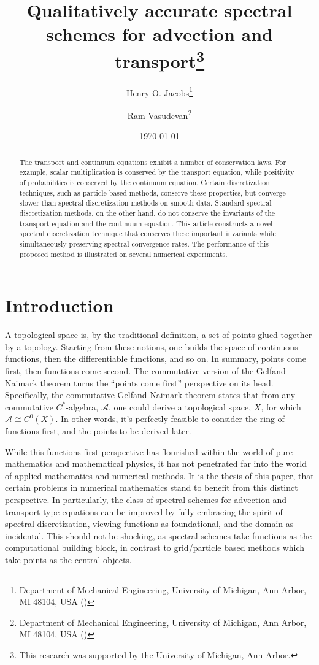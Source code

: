 \documentclass[final,leqno]{siamart}
\title{Qualitatively accurate spectral schemes for advection and transport\thanks{This research was supported by the University of Michigan, Ann Arbor.}}
\author{
    Henry O. Jacobs\thanks{Department of Mechanical Engineering, University of Michigan, Ann Arbor, MI 48104, USA (\email{hojacobs@umich.edu})}
    \and
    Ram Vasudevan\thanks{Department of Mechanical Engineering, University of Michigan, Ann Arbor, MI 48104, USA (\email{ramv@umich.edu}) }
}
\date{\today}
\begin{document}
\maketitle

\begin{abstract}
	The transport and continuum equations exhibit a number of conservation laws.
	For example, scalar multiplication is conserved by the transport equation, while
	positivity of probabilities is conserved by the continuum equation.
	Certain discretization techniques, such as particle based methods, conserve these properties, but converge slower than spectral discretization methods on smooth data.
	Standard spectral discretization methods, on the other hand, do not conserve the invariants of the transport equation and the continuum equation.
	This article constructs a novel spectral discretization technique that conserves these important invariants while simultaneously preserving spectral convergence rates. 
	The performance of this proposed method is illustrated on several numerical experiments. 
\end{abstract}

\section{Introduction}
\label{sec:intro}

A topological space is, by the traditional definition, a set of points glued together by a topology.
Starting from these notions, one builds the space of continuous functions, then the differentiable functions, and so on.
In summary, points come first, then functions come second.
The commutative version of the Gelfand-Naimark theorem turns the ``points come first'' perspective on its head.
Specifically, the commutative Gelfand-Naimark theorem states that from any commutative $C^*$-algebra, $\mathcal{A}$, one could derive a topological space, $X$, for which $\mathcal{A} \cong C^0(X)$.
In other words, it's perfectly feasible to consider the ring of functions first, and the points to be derived later.


While this functions-first perspective has flourished within the world of pure mathematics and mathematical physics, it has not penetrated far into the world of applied mathematics and numerical methods.
It is the thesis of this paper, that certain problems in numerical mathematics stand to benefit from this distinct perspective.
In particularly, the class of spectral schemes for advection and transport type equations can be improved by fully embracing the spirit of spectral discretization, viewing functions as foundational, and the domain as incidental.
This should not be shocking, as spectral schemes take functions as the computational building block, in contrast to grid/particle based methods which take points as the central objects.
\end{document}

